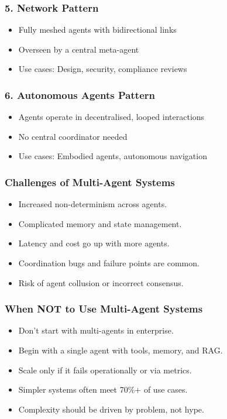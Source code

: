 \begin{frame}[fragile]\frametitle{5. Network Pattern}
    \begin{itemize}
        \item Fully meshed agents with bidirectional links
        \item Overseen by a central meta-agent
        \item Use cases: Design, security, compliance reviews
    \end{itemize}
\end{frame}

\begin{frame}[fragile]\frametitle{6. Autonomous Agents Pattern}
    \begin{itemize}
        \item Agents operate in decentralised, looped interactions
        \item No central coordinator needed
        \item Use cases: Embodied agents, autonomous navigation
    \end{itemize}
\end{frame}

\begin{frame}[fragile]\frametitle{Challenges of Multi-Agent Systems}
  \begin{itemize}
    \item Increased non-determinism across agents.
    \item Complicated memory and state management.
    \item Latency and cost go up with more agents.
    \item Coordination bugs and failure points are common.
    \item Risk of agent collusion or incorrect consensus.
  \end{itemize}
\end{frame}

\begin{frame}[fragile]\frametitle{When NOT to Use Multi-Agent Systems}
  \begin{itemize}
    \item Don’t start with multi-agents in enterprise.
    \item Begin with a single agent with tools, memory, and RAG.
    \item Scale only if it fails operationally or via metrics.
    \item Simpler systems often meet 70\%+ of use cases.
    \item Complexity should be driven by problem, not hype.
  \end{itemize}
\end{frame}

